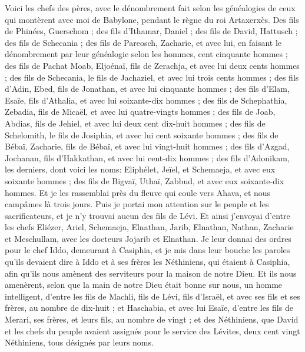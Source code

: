 \begin{multicols}{2}
\VerseOne{}Voici les chefs des pères, avec le dénombrement fait selon les généalogies de ceux qui montèrent avec moi de Babylone, pendant le règne du roi Artaxerxès.
Des fils de Phinées, Guerschom ; des fils d'Ithamar, Daniel ; des fils de David, Hattusch ;
des fils de Schecania ; des fils de Pareosch, Zacharie, et avec lui, en faisant le dénombrement par leur généalogie selon les hommes, cent cinquante hommes ;
des fils de Pachat Moab, Eljoénaï, fils de Zerachja, et avec lui deux cents hommes ;
des fils de Schecania, le fils de Jachaziel, et avec lui trois cents hommes ;
des fils d'Adin, Ebed, fils de Jonathan, et avec lui cinquante hommes ;
des fils d'Elam, Esaïe, fils d'Athalia, et avec lui soixante-dix hommes ;
des fils de Schephathia, Zebadia, fils de Micaël, et avec lui quatre-vingts hommes ;
des fils de Joab, Abdias, fils de Jehiel, et avec lui deux cent dix-huit hommes ;
des fils de Schelomith, le fils de Josiphia, et avec lui cent soixante hommes ;
des fils de Bébaï, Zacharie, fils de Bébaï, et avec lui vingt-huit hommes ;
des fils d'Azgad, Jochanan, fils d'Hakkathan, et avec lui cent-dix hommes ;
des fils d'Adonikam, les derniers, dont voici les noms: Eliphélet, Jeïel, et Schemaeja, et avec eux soixante hommes ;
des fils de Bigvaï, Uthaï, Zabbud, et avec eux soixante-dix hommes.
Et je les rassemblai près du fleuve qui coule vers Ahava, et nous campâmes là trois jours. Puis je portai mon attention sur le peuple et les sacrificateurs, et je n'y trouvai aucun des fils de Lévi.
Et ainsi j'envoyai d'entre les chefs Eliézer, Ariel, Schemaeja, Elnathan, Jarib, Elnathan, Nathan, Zacharie et Meschullam, avec les docteurs Jojarib et Elnathan.
Je leur donnai des ordres pour le chef Iddo, demeurant à Casiphia, et je mis dans leur bouche les paroles qu'ils devaient dire à Iddo et à ses frères les Néthiniens, qui étaient à Casiphia, afin qu'ils nous amènent des serviteurs pour la maison de notre Dieu.
 Et ils nous amenèrent, selon que la main de notre Dieu était bonne sur nous, un homme intelligent, d'entre les fils de Machli, fils de Lévi, fils d'Israël, et avec ses fils et ses frères, au nombre de dix-huit ;
et Haschabia, et avec lui Esaïe, d'entre les fils de Merari, ses frères, et leurs fils, au nombre de vingt ;
et des Néthiniens, que David et les chefs du peuple avaient assignés pour le service des Lévites, deux cent vingt Néthiniens, tous désignés par leurs noms.

\end{multicols}
